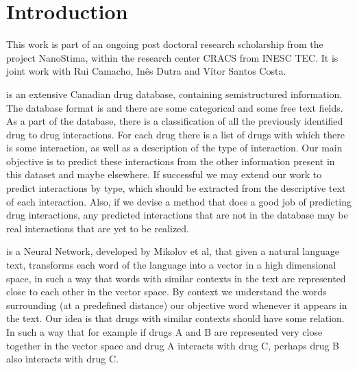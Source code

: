 \documentclass[12pt, openany]{book}
\begin{document}
\tableofcontents





\chapter{Introduction}

This work is part of an ongoing post doctoral research scholarship from the project NanoStima, within the research center CRACS from INESC TEC. It is joint work with Rui Camacho, In\^es Dutra and V\'itor Santos Costa.

\drugbank is an extensive Canadian drug database, containing semistructured information. The database format is \xml and there are some categorical and some free text fields. As a part of the database, there is a classification of all the previously identified drug to drug interactions. For each drug there is a list of drugs with which there is some interaction, as well as a description of the type of interaction. Our main objective is to predict these interactions from the other information present in this dataset and maybe elsewhere. If successful we may extend our work to predict interactions by type, which should be extracted from the descriptive text of each interaction. Also, if we devise a method that does a good job of predicting drug interactions, any predicted interactions that are not in the database may be real interactions that are yet to be realized.

\wordvec is a Neural Network, developed by Mikolov et al, that given a natural language text, transforms each word of the language into a vector in a high dimensional space, in such a way that words with similar contexts in the text are represented close to each other in the vector space. By context we understand the words surrounding (at a predefined distance) our objective word whenever it appears in the text. Our idea is that drugs with similar contexts should have some relation. In such a way that for example if drugs A and B are represented very close together in the vector space and drug A interacts with drug C, perhaps drug B also interacts with drug C.
\end{document}
